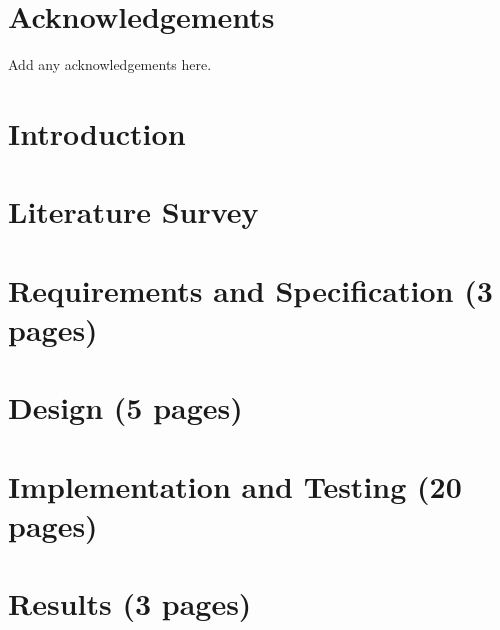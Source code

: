 
\maketitle
\newpage


\newpage


\declaration{\disstitle}{\authorname} %
\newpage


\abstract

\newpage


\tableofcontents
\newpage
\listoffigures
\newpage
\listoftables
\newpage


\chapter*{Acknowledgements}
Add any acknowledgements here.
\newpage


\setcounter{page}{1}



\chapter{Introduction}

\chapter{Literature Survey}


\chapter{Requirements and Specification (3 pages)}


\chapter{Design (5 pages)}


\chapter{Implementation and Testing (20 pages)}


\chapter{Results (3 pages)}

